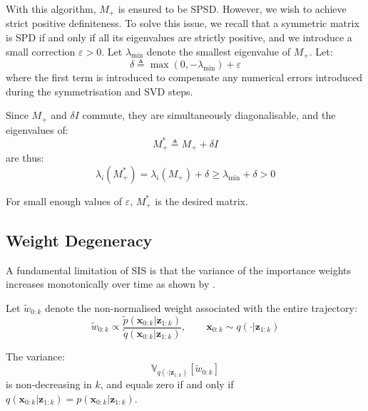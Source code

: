 With this algorithm, $M_+$ is ensured to be SPSD. However, we wish to achieve strict positive definiteness. To solve this issue, we recall that a symmetric matrix is SPD if and only if all its eigenvalues are strictly positive, and we introduce a small correction $\varepsilon>0$. Let $\lambda_{\min}$ denote the smallest eigenvalue of $M_+$. Let:
\begin{equation}
	\delta\triangleq\max(0,-\lambda_{\min})+\varepsilon
\end{equation}
where the first term is introduced to compensate any numerical errors introduced during the symmetrisation and SVD steps.

Since $M_+$ and $\delta I$ commute, they are simultaneously diagonalisable, and the eigenvalues of:
\begin{equation}
	M_+^*\triangleq M_++\delta I
\end{equation}
are thus:
\begin{equation}
	\lambda_i(M_+^*)=\lambda_i(M_+)+\delta\geq\lambda_{\min}+\delta>0
\end{equation}

For small enough values of $\varepsilon$, $M_+^*$ is the desired matrix.

\subsection{Weight Degeneracy}

A fundamental limitation of SIS is that the variance of the importance weights increases monotonically over time as shown by .

\begin{proposition}\label{th:variance_weights}
	Let $\tilde{w}_{0:k}$ denote the non-normalised weight associated with the entire trajectory:
	\begin{equation}
		\tilde{w}_{0:k}\propto\frac{\tilde{p}(\mathbf{x}_{0:k}|\mathbf{z}_{1:k})}{\tilde{q}(\mathbf{x}_{0:k}|\mathbf{z}_{1:k})},\qquad\mathbf{x}_{0:k}\sim q(\cdot|\mathbf{z}_{1:k})
	\end{equation}

	The variance:
	\begin{equation}
		\mathbb{V}_{q(\cdot|\mathbf{z}_{1:k})}[\tilde{w}_{0:k}]
	\end{equation}
	is non-decreasing in $k$, and equals zero if and only if $q(\mathbf{x}_{0:k}|\mathbf{z}_{1:k})=p(\mathbf{x}_{0:k}|\mathbf{z}_{1:k})$.
\end{proposition}

